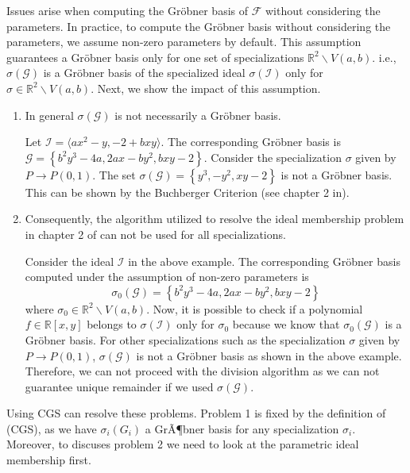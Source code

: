 \documentclass[runningheads]{llncs}
\newcommand{\Rr}{\mathbb{R}}
\newcommand{\1}{\chi}
\newcommand{\Ff}{\mathcal{F}}
\newcommand{\Gg}{\mathcal{G}}
\newcommand{\Ii}{\mathcal{I}}
\begin{document}
Issues arise when computing the Gr{\"o}bner basis of $\Ff$ without considering the parameters.
In practice, to compute the Gr{\"o}bner basis without considering the parameters, we assume non-zero parameters by default.
This assumption guarantees a Gr{\"o}bner basis only for one set of specializations $\Rr^2\backslash V(a,b)$. i.e., 
$\sigma(\Gg)$ is a Gr{\"o}bner basis of the specialized ideal $\sigma(\Ii)$ only for $\sigma \in \Rr^2\backslash V(a,b)$.
Next, we show the impact of this assumption.
\begin{enumerate}
    \item In general $\sigma\left(\Gg\right)$ is not necessarily a Gr{\"o}bner basis.
    \begin{example}
        \label{ex431}
        Let $\Ii=\langle 
           {a x^2 - y, -2 + b x y} \rangle$. The corresponding Gr{\"o}bner basis 
           is $\Gg=\left\{b^2 y^3-4 a,2 a x-b y^2,b x y-2\right\}$. Consider 
           the specialization $\sigma$ given by $P\rightarrow P(0,1)$.
           The set $\sigma(\Gg)=\left\{y^3,-y^2,x y-2\right\}$ is not a Gr{\"o}bner basis.
		   This can be shown by the Buchberger Criterion (see chapter 2 in\cite{Cox}).

    \end{example}
    \item Consequently, the algorithm utilized to resolve the ideal membership 
    problem in chapter 2 of \cite{Cox} can not be used for all specializations. 
    
    \begin{example}
        \label{ex433}
        Consider the ideal $\Ii$ in the above example. The corresponding Gr{\"o}bner basis computed under the assumption of non-zero parameters
        is $$\sigma_0(\Gg)=\left\{b^2 y^3-4 a,2 a x-b y^2,b x y-2\right\}$$ where $\sigma_0 \in \Rr^2\backslash V(a,b)$. 
        Now, it is possible to check if a polynomial $f\in \Rr[x,y]$ belongs to $\sigma(\Ii)$ only for $\sigma_0 $     
        because we know that $\sigma_0(\Gg)$ is a Gr{\"o}bner basis. For other specializations such as 
        the specialization $\sigma$ given by $P\rightarrow P(0,1)$, $\sigma(\Gg)$ is not a Gr{\"o}bner basis as shown in the above example. 
        Therefore, we can not proceed with the division algorithm as we can not guarantee unique remainder if we used $\sigma(\Gg)$.  
    \end{example}


\end{enumerate}

Using CGS can resolve these problems. Problem 1 is fixed by the definition of (CGS), as we have $\sigma_i(G_i)$ a 
 GrÃ¶bner basis for any specialization $\sigma_i$. Moreover, 
 to discuses problem 2 we need to look at the parametric ideal membership first.
\end{document}

